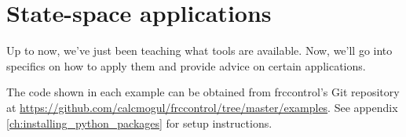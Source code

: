 
\chapter{State-space applications}

Up to now, we've just been teaching what tools are available. Now, we'll go into
specifics on how to apply them and provide advice on certain applications.

The code shown in each example can be obtained from frccontrol's Git repository
at \url{https://github.com/calcmogul/frccontrol/tree/master/examples}. See
appendix \ref{ch:installing_python_packages} for setup instructions.

\renewcommand*{\chapterpath}{\partpath/ss-applications}







